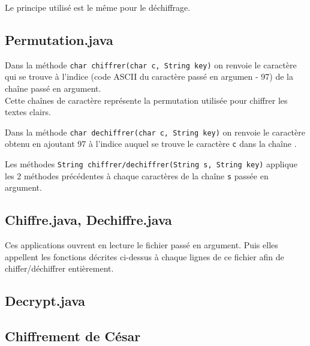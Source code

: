 \documentclass{article}
\begin{document}
Le principe utilisé est le même pour le déchiffrage. \\
\vspace{2\baselineskip}

\subsection{Permutation.java}
\vspace{1\baselineskip}

Dans la méthode \texttt{char chiffrer(char c, String key)} on renvoie le caractère qui se trouve à l'indice (code ASCII du caractère passé en argumen - 97) de la chaîne passé en argument. \\
Cette chaînes de caractère représente la permutation utilisée pour chiffrer les textes clairs. \\
\vspace{1\baselineskip}

Dans la méthode \texttt{char dechiffrer(char c, String key)} on renvoie le caractère obtenu en ajoutant 97 à l'indice auquel se trouve le caractère \texttt{c} dans la chaîne . \\
\vspace{1\baselineskip}

Les méthodes \texttt{String chiffrer/dechiffrer(String s, String key)} applique les 2 méthodes précédentes à chaque caractères de la chaîne \texttt{s} passée en argument. \\
\vspace{2\baselineskip}

\subsection{Chiffre.java, Dechiffre.java}
\vspace{1\baselineskip}

Ces applications ouvrent en lecture le fichier passé en argument. Puis elles appellent les fonctions décrites ci-dessus à chaque lignes de ce fichier afin de chiffer/déchiffrer entièrement. \\
\vspace{2\baselineskip}

\subsection{Decrypt.java}
\vspace{1\baselineskip}

\subsection{Chiffrement de César}
\vspace{1\baselineskip}
\end{document}
